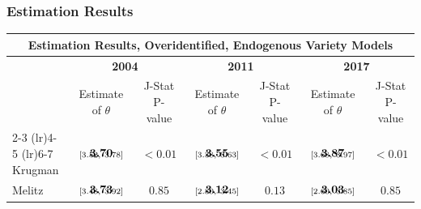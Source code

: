 \documentclass[10pt,pdftex,aspectratio=1610]{beamer}
\theoremstyle{definition}
\begin{document}

\begin{frame}[t]
\frametitle{Estimation Results}
\footnotesize

\begin{table}[!t]
\footnotesize
\renewcommand{\arraystretch}{1.85}
\setlength {\tabcolsep}{1.75mm}
\begin{center}\label{tb:data_rslts}
\begin{tabular}[t]{l c c c c c c }
\multicolumn{7}{c}{\normalsize \textbf{ Estimation Results, Overidentified, Endogenous Variety Models}}
\\
\hline
\hline
& \multicolumn{2}{c}{\textbf{2004}} & \multicolumn{2}{c}{\textbf{2011}} & \multicolumn{2}{c}{\textbf{2017}} \\
& Estimate of $\theta$ & J-Stat P-value & Estimate of $\theta$ & J-Stat P-value & Estimate of $\theta$ & J-Stat P-value \\
\cmidrule(r){2-3}  \cmidrule(lr){4-5} \cmidrule(lr){6-7}
Krugman       & $\begin{array}{c}{\textbf{3.70}} \vspace{-.4cm}\\ \scriptstyle{[3.52,   \ 3.78]}\end{array}$ & $< 0.01$&
$\begin{array}{c}{\textbf{3.55}} \vspace{-.4cm}\\ \scriptstyle{[3.38,   \ 3.63]}\end{array}$ & $< 0.01$&
$\begin{array}{c}{\textbf{3.87}} \vspace{-.4cm}\\ \scriptstyle{[3.68,   \ 3.97]}\end{array}$ &$< 0.01$\\
Melitz            & $\begin{array}{c}{\textbf{3.73}} \vspace{-.4cm}\\ \scriptstyle{[3.48,   \ 3.92]}\end{array}$  & $0.85$&
$\begin{array}{c}{\textbf{3.12}} \vspace{-.4cm}\\ \scriptstyle{[2.80,   \ 3.45]}\end{array}$ & $0.13$&
$\begin{array}{c}{\textbf{3.03}} \vspace{-.4cm}\\ \scriptstyle{[2.60,   \ 3.85]}\end{array}$ & $0.85$\\
\hline
\end{tabular}
\\[0.75ex]
\parbox{2.5in}{\footnotesize }
\end{center}
\end{table}


\end{frame}
\end{document}
